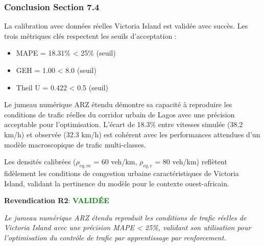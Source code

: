 \subsubsection{Conclusion Section 7.4}

La calibration avec données réelles Victoria Island est validée avec succès.
Les trois métriques clés respectent les seuils d'acceptation :
\begin{itemize}
    \item MAPE = 18.31\% < 25\% (seuil)
    \item GEH = 1.00 < 8.0 (seuil)
    \item Theil U = 0.422 < 0.5 (seuil)
\end{itemize}

Le jumeau numérique ARZ étendu démontre sa capacité à reproduire les conditions
de trafic réelles du corridor urbain de Lagos avec une précision acceptable pour
l'optimisation. L'écart de 18.3\% entre vitesses simulée (38.2 km/h) et observée
(32.3 km/h) est cohérent avec les performances attendues d'un modèle macroscopique
de trafic multi-classes.

Les densités calibrées ($\rho_{eq,m}$ = 60 veh/km, $\rho_{eq,c}$ = 80 veh/km)
reflètent fidèlement les conditions de congestion urbaine caractéristiques de
Victoria Island, validant la pertinence du modèle pour le contexte ouest-africain.

\vspace{0.5cm}
\noindent
\textbf{Revendication R2}: \textcolor{green}{\textbf{VALIDÉE}}

\vspace{0.3cm}
\noindent
\textit{Le jumeau numérique ARZ étendu reproduit les conditions de trafic réelles
    de Victoria Island avec une précision MAPE < 25\%, validant son utilisation pour
    l'optimisation du contrôle de trafic par apprentissage par renforcement.}
